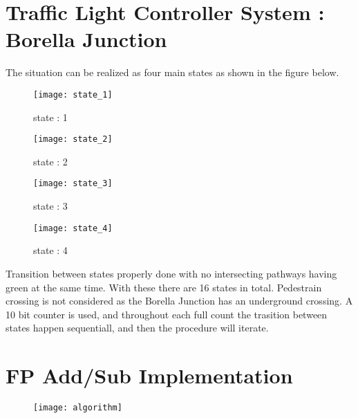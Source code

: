 \documentclass[11pt]{article}
\begin{document}
    \section{Traffic Light Controller System : Borella Junction}
    The situation can be realized as four main states as shown in the figure below.
    \begin{figure}[h]
        \begin{minipage}{.24\textwidth}
            \begin{center}
                \texttt{[image: state\_1]}
                \caption*{state : 1}
            \end{center}
        \end{minipage}
        \begin{minipage}{.24\textwidth}
            \begin{center}
                \texttt{[image: state\_2]}
                \caption*{state : 2}
            \end{center}
        \end{minipage}
        \begin{minipage}{.24\textwidth}
            \begin{center}
                \texttt{[image: state\_3]}
                \caption*{state : 3}
            \end{center}
        \end{minipage}
        \begin{minipage}{.24\textwidth}
            \begin{center}
                \texttt{[image: state\_4]}
                \caption*{state : 4}
            \end{center}
        \end{minipage}
    \end{figure}
    \newline
    Transition between states properly done with no intersecting pathways having green at the same time. With these there are 16 states in total.
    \newline
    Pedestrain crossing is not considered as the Borella Junction has an underground crossing. A 10 bit counter is used, and throughout each full count the trasition between states happen sequentiall, and then the procedure will iterate.
    \newpage
    \appendix


    \section{FP Add/Sub Implementation}
    \begin{figure}[h]
        \begin{center}
            \texttt{[image: algorithm]}
        \end{center}
    \end{figure}
\end{document}
